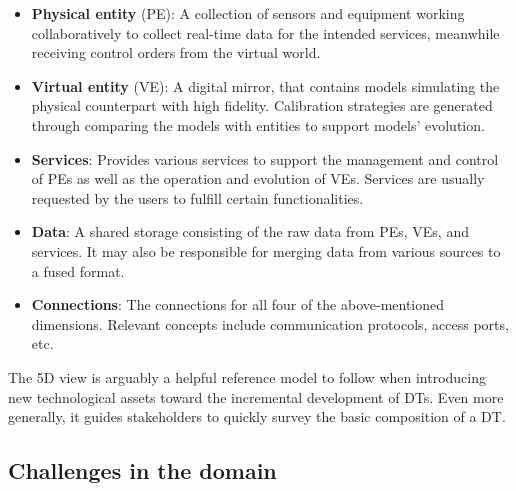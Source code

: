 \documentclass[journal,onecolumn]{IEEEtran} %
\begin{document}
\begin{itemize}

  \item \textbf{Physical entity} (PE): A collection of sensors and equipment working collaboratively to collect real-time data for the intended services, meanwhile receiving control orders from the virtual world.    

  \item \textbf{Virtual entity} (VE): A digital mirror, that contains models simulating the physical counterpart with high fidelity. Calibration strategies are generated through comparing the models with entities to support models' evolution.
  
  \item \textbf{Services}: Provides various services to support the management and control of PEs as well as the operation and evolution of VEs. Services are usually requested by the users to fulfill certain functionalities.
       
  \item \textbf{Data}: A shared storage consisting of the raw data from PEs, VEs, and services. It may also be responsible for merging data from various sources to a fused format. 
   
  \item \textbf{Connections}: The connections for all four of the above-mentioned dimensions. Relevant concepts include communication protocols, access ports, etc.
  
\end{itemize}

The 5D view is arguably a helpful reference model to follow when introducing new technological assets toward the incremental development of DTs. Even more generally, it guides stakeholders to quickly survey the basic composition of a DT.

\subsection{Challenges in the domain}\label{sec:challenges}
\end{document}
